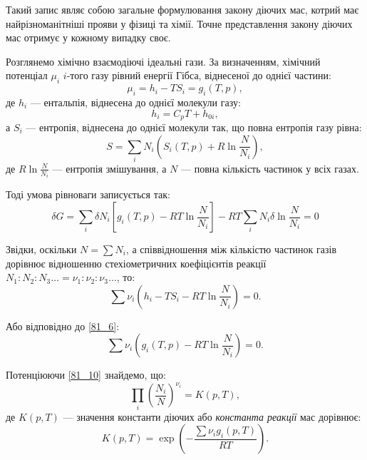 Такий запис являє собою загальне формулювання закону діючих мас, котрий має найрізноманітніші прояви у фізиці та хімії. Точне представлення закону діючих мас отримує у кожному випадку своє.

Розглянемо хімічно взаємодіючі ідеальні гази. За визначенням, хімічний потенціал $\mu_i$ $i$-того газу рівний енергії Гібса, віднесеної до однієї частини:
\begin{equation} \label{81_6}
\mu_i = h_i - T S_i = g_i(T, p),
\end{equation}
%
де $h_i$ --- ентальпія, віднесена до однієї молекули газу:
\begin{equation} \label{81_7}
h_i = C_p T + h_{0i},
\end{equation}
%
а $S_i$ --- ентропія, віднесена до однієї молекули так, що повна ентропія газу рівна:
\begin{equation} \label{81_8}
S = \sum_i N_i \left(S_i(T,p) + R \ln \frac{N}{N_i}\right),
\end{equation}
%
де $R \ln \frac{N}{N_i}$ --- ентропія змішування, а $N$ --- повна кількість частинок у всіх газах.

Тоді умова рівноваги записується так:
\begin{equation*}
\delta G = \sum_i \delta N_i \left[g_i(T,p) - R T \ln \frac{N}{N_i}\right] - R T \sum_i N_i \delta \ln \frac{N}{N_i} = 0
\end{equation*}

Звідки, оскільки $N = \sum N_i$, а співвідношення між кількістю частинок газів дорівнює відношенню стехіометричних коефіцієнтів реакції $N_1 : N_2 : N_3 \ldots = \nu_1 : \nu_2 : \nu_3 \ldots$, то:
\begin{equation} \label{81_9}
\sum \nu_i \left(h_i - T S_i - R T \ln \frac{N}{N_i}\right) = 0.
\end{equation}

Або відповідно до \eqref{81_6}:
\begin{equation} \label{81_10}
\sum \nu_i \left(g_i(T,p) - R T \ln \frac{N}{N_i}\right) = 0.
\end{equation}

Потенціюючи \eqref{81_10} знайдемо, що:
\begin{equation} \label{81_11}
\prod_i \left(\frac{N_i}{N}\right)^{\nu_i} = K(p,T),
\end{equation}
%
де $K(p,T)$ --- значення константи діючих або \emph{константа реакції} мас дорівнює:
\begin{equation} \label{81_12}
K(p,T) = \exp \left(-\frac{\sum \nu_i g_i(p,T)}{R T}\right).
\end{equation}

